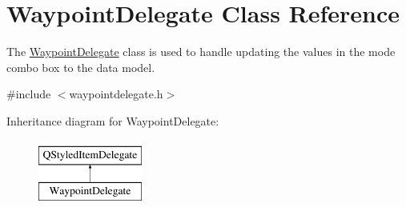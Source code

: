 \hypertarget{class_waypoint_delegate}{\section{Waypoint\-Delegate Class Reference}
\label{class_waypoint_delegate}
}


The \hyperlink{class_waypoint_delegate}{Waypoint\-Delegate} class is used to handle updating the values in the mode combo box to the data model.  




{\ttfamily \#include $<$waypointdelegate.\-h$>$}

Inheritance diagram for Waypoint\-Delegate\-:\begin{figure}[H]
\begin{center}
\leavevmode
\includegraphics[height=2.000000cm]{class_waypoint_delegate}
\end{center}
\end{figure}

